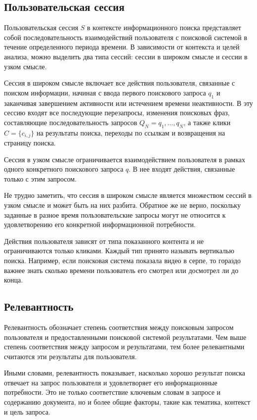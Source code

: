 \documentclass[diploma]{nanolab2015}
\begin{document}
\subsection{Пользовательская сессия}

Пользовательская сессия $S$ в контексте информационного поиска представляет собой последовательность взаимодействий пользователя с поисковой системой в течение определенного периода времени. В зависимости от контекста и целей анализа, можно выделить два типа сессий: сессии в широком смысле и сессии в узком смысле.

Сессия в широком смысле включает все действия пользователя, связанные с поиском информации, начиная с ввода первого поискового запроса $q_1$ и заканчивая завершением активности или истечением времени неактивности. В эту сессию входят все последующие перезапросы, изменения поисковых фраз, составляющие последовательность запросов $Q_N = {q_1, \dots, q_N}$, а также клики $C = \{c_{i,j}\}$ на результаты поиска, переходы по ссылкам и возвращения на страницу поиска.

Сессия в узком смысле ограничивается взаимодействием пользователя в рамках одного конкретного поискового запроса $q$. В нее входят действия, связанные только с этим запросом.

Не трудно заметить, что сессия в широком смысле является множеством сессий в узком смысле и может быть на них разбита. Обратное же не верно, поскольку заданные в разное время пользовательские запросы могут не относится к удовлетворению его конкретной информационной потребности.

Действия пользователя зависят от типа показанного контента и не ограничиваются только кликами. Каждый тип принято называть вертикалью поиска. Например, если поисковая система показала видео в серпе, то гораздо важнее знать сколько времени пользователь его смотрел или досмотрел ли до конца.

\subsection{Релевантность}
Релевантность обозначает степень соответствия между поисковым запросом пользователя и предоставленными поисковой системой результатами. Чем выше степень соответствия между запросом и результатами, тем более релевантными считаются эти результаты для пользователя.

Иными словами, релевантность показывает, насколько хорошо результат поиска отвечает на запрос пользователя и удовлетворяет его информационные потребности. Это не только соответствие ключевым словам в запросе и содержанию документа, но и более общие факторы, такие как тематика, контекст и цель запроса.
\end{document}
